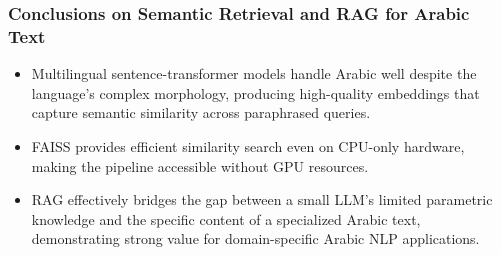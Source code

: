 \subsubsection{Conclusions on Semantic Retrieval and RAG for Arabic Text}

\begin{itemize}
  \item Multilingual sentence-transformer models handle Arabic well despite the language's complex morphology, producing high-quality embeddings that capture semantic similarity across paraphrased queries.
  \item FAISS provides efficient similarity search even on CPU-only hardware, making the pipeline accessible without GPU resources.
  \item RAG effectively bridges the gap between a small LLM's limited parametric knowledge and the specific content of a specialized Arabic text, demonstrating strong value for domain-specific Arabic NLP applications.
\end{itemize}